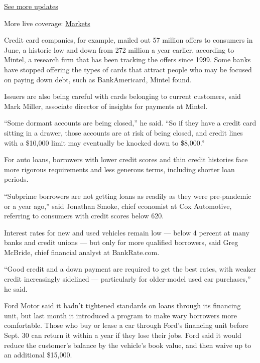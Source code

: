 \href{https://www.nytimes3xbfgragh.onion/2020/08/20/world/coronavirus-covid.html?action=click\&pgtype=Article\&state=default\&region=MAIN_CONTENT_1\&context=storylines_live_updates}{See
more updates}

More live coverage:
\href{https://www.nytimes3xbfgragh.onion/live/2020/08/20/business/stock-market-today-coronavirus?action=click\&pgtype=Article\&state=default\&region=MAIN_CONTENT_1\&context=storylines_live_updates}{Markets}

Credit card companies, for example, mailed out 57 million offers to
consumers in June, a historic low and down from 272 million a year
earlier, according to Mintel, a research firm that has been tracking the
offers since 1999. Some banks have stopped offering the types of cards
that attract people who may be focused on paying down debt, such as
BankAmericard, Mintel found.

Issuers are also being careful with cards belonging to current
customers, said Mark Miller, associate director of insights for payments
at Mintel.

``Some dormant accounts are being closed,'' he said. ``So if they have a
credit card sitting in a drawer, those accounts are at risk of being
closed, and credit lines with a \$10,000 limit may eventually be knocked
down to \$8,000.''

For auto loans, borrowers with lower credit scores and thin credit
histories face more rigorous requirements and less generous terms,
including shorter loan periods.

``Subprime borrowers are not getting loans as readily as they were
pre-pandemic or a year ago,'' said Jonathan Smoke, chief economist at
Cox Automotive, referring to consumers with credit scores below 620.

Interest rates for new and used vehicles remain low --- below 4 percent
at many banks and credit unions --- but only for more qualified
borrowers, said Greg McBride, chief financial analyst at BankRate.com.

``Good credit and a down payment are required to get the best rates,
with weaker credit increasingly sidelined --- particularly for
older-model used car purchases,'' he said.

Ford Motor said it hadn't tightened standards on loans through its
financing unit, but last month it introduced a program to make wary
borrowers more comfortable. Those who buy or lease a car through Ford's
financing unit before Sept. 30 can return it within a year if they lose
their jobs. Ford said it would reduce the customer's balance by the
vehicle's book value, and then waive up to an additional \$15,000.

